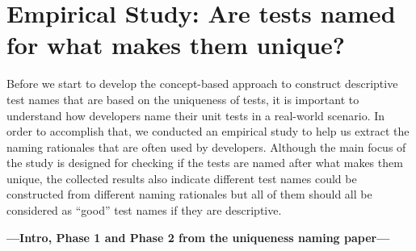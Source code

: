 \section{Empirical Study: Are tests named for what makes them unique?}
\label{sec:empStudy}

Before we start to develop the concept-based approach to construct descriptive test names that are based on the uniqueness of tests, it is important to understand how developers name their unit tests in a real-world scenario.
%
In order to accomplish that, we conducted an empirical study to help us extract the naming rationales that are often used by developers.
%
Although the main focus of the study is designed for checking if the tests are named after what makes them unique, the collected results also indicate different test names could be constructed from different naming rationales but all of them should all be considered as \enquote{good} test names if they are descriptive.

\textbf{---Intro, Phase 1 and Phase 2 from the uniqueness naming paper---}



